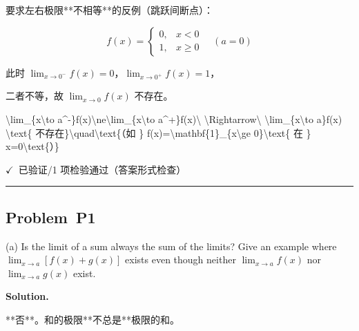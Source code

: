 \documentclass[12pt, a4paper]{article}
\newcommand{\problem}[1]{\subsection*{Problem~#1}}
\newcommand{\solution}{%
  \par\noindent
  {\color{solutiongreen}\bfseries Solution.}\par
}
\newcommand{\verifyok}{\textcolor{solutiongreen}{\ensuremath{\checkmark}\ 已验证}}
\begin{document}
\begin{stepbox}

\end{stepbox}

\begin{stepbox}
要求左右极限**不相等**的反例（跳跃间断点）：
\end{stepbox}

\begin{stepbox}
$$f(x) = \begin{cases} 0, & x < 0\\ 1, & x \ge 0\end{cases}\quad (a=0)$$
\end{stepbox}

\begin{stepbox}
此时 $\lim_{x\to 0^-}f(x) = 0$，$\lim_{x\to 0^+}f(x) = 1$，
\end{stepbox}

\begin{stepbox}
二者不等，故 $\lim_{x\to 0}f(x)$ 不存在。
\end{stepbox}

\begin{center}
\textbackslash{}lim\_\{x\textbackslash{}to a\textasciicircum{}-\}f(x)\textbackslash{}ne\textbackslash{}lim\_\{x\textbackslash{}to a\textasciicircum{}+\}f(x)\textbackslash{} \textbackslash{}Rightarrow\textbackslash{} \textbackslash{}lim\_\{x\textbackslash{}to a\}f(x) \textbackslash{}text\{ 不存在\}\textbackslash{}quad\textbackslash{}text\{（如 \} f(x)=\textbackslash{}mathbf\{1\}\_\{x\textbackslash{}ge 0\}\textbackslash{}text\{ 在 \} x=0\textbackslash{}text\{）\}
\end{center}

\begin{verifybox}\small \verifyok{}/1 项检验通过（答案形式检查） \end{verifybox}

\vspace{0.8em}\hrule\vspace{0.8em}

\problem{P1}

\begin{stepbox}
(a) Is the limit of a sum always the sum of the limits? Give an example where $\lim_{x \to a}[f(x) + g(x)]$ exists even though neither $\lim_{x \to a} f(x)$ nor $\lim_{x \to a} g(x)$ exist.
\end{stepbox}

\solution

\begin{stepbox}
**否**。和的极限**不总是**极限的和。
\end{stepbox}
\end{document}
